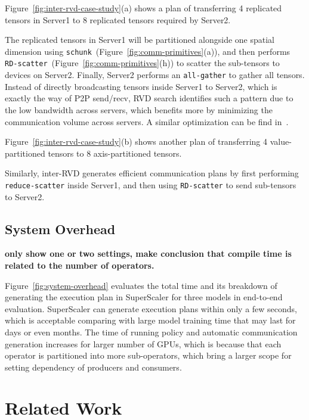Figure~\ref{fig:inter-rvd-case-study}(a) shows a plan of transferring 4 replicated tensors in Server1 to 8 replicated tensors required by Server2. 

The replicated tensors in Server1 will be partitioned alongside one spatial dimension using \texttt{schunk}~(Figure~\ref{fig:comm-primitives}(a)), and then performs \texttt{RD-scatter}~(Figure~\ref{fig:comm-primitives}(h)) to scatter the sub-tensors to devices on Server2. Finally, Server2 performs an \texttt{all-gather} to gather all tensors. Instead of directly broadcasting tensors inside Server1 to Server2, which is exactly the way of P2P send/recv, RVD search identifies such a pattern due to the low bandwidth across servers, which benefits more by minimizing the communication volume across servers. A similar optimization can be find in~\cite{megatron2}.

Figure~\ref{fig:inter-rvd-case-study}(b) shows another plan of transferring 4 value-partitioned tensors to 8 axis-partitioned tensors. 

Similarly, inter-RVD generates efficient communication plans by first performing \texttt{reduce-scatter} inside Server1, and then using \texttt{RD-scatter} to send sub-tensors to Server2.

\subsection{System Overhead}
\label{sec:eval-overhead}

{\color{red} {\bf only show one or two settings, make conclusion that compile time is related to the number of operators.}}

Figure~\ref{fig:system-overhead} evaluates the total time and its breakdown of generating the execution plan in {SuperScaler} for three models in end-to-end evaluation. {SuperScaler} can generate execution plans within only a few seconds, which is acceptable comparing with large model training time that may last for days or even months. The time of running policy and automatic communication generation increases for larger number of GPUs, which is because that each operator is partitioned into more sub-operators, which bring a larger scope for setting dependency of producers and consumers.

\fi

\section{Related Work}
\label{sec:related}

